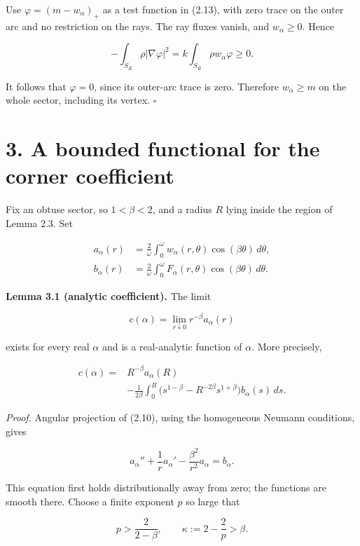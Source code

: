 \documentclass[11pt]{article}
\begin{document}
Use \(\varphi=(m-w_\alpha)_+\) as a test function in (2.13), with zero
trace on the outer arc and no restriction on the rays. The ray fluxes
vanish, and \(w_\alpha\ge0\). Hence

\[
-\int_{S_R}\rho|\nabla\varphi|^2
=k\int_{S_R}\rho w_\alpha\varphi\ge0.
\tag{2.14}
\]

It follows that \(\varphi=0\), since its outer-arc trace is zero.
Therefore \(w_\alpha\ge m\) on the whole sector, including its vertex. \(\square\)

\section{3. A bounded functional for the corner
coefficient}\label{a-bounded-functional-for-the-corner-coefficient}

Fix an obtuse sector, so \(1<\beta<2\), and a radius \(R\) lying inside
the region of Lemma 2.3. Set

\[
\begin{aligned}
a_\alpha(r)&=\frac2\omega\int_0^\omega
w_\alpha(r,\theta)\cos(\beta\theta)\,d\theta,\\
b_\alpha(r)&=\frac2\omega\int_0^\omega
F_\alpha(r,\theta)\cos(\beta\theta)\,d\theta.
\end{aligned}
\tag{3.1}
\]

\textbf{Lemma 3.1 (analytic coefficient).} The limit

\[
c(\alpha)=\lim_{r\downarrow0}r^{-\beta}a_\alpha(r)
\tag{3.2}
\]

exists for every real \(\alpha\) and is a real-analytic function of
\(\alpha\). More precisely,

\[
\begin{aligned}
c(\alpha)={}&R^{-\beta}a_\alpha(R)\\
&-\frac1{2\beta}\int_0^R
\big(s^{1-\beta}-R^{-2\beta}s^{1+\beta}\big)b_\alpha(s)\,ds.
\end{aligned}
\tag{3.3}
\]

\emph{Proof.} Angular projection of (2.10), using the homogeneous
Neumann conditions, gives

\[
a_\alpha''+\frac1r a_\alpha'-\frac{\beta^2}{r^2}a_\alpha=b_\alpha.
\tag{3.4}
\]

This equation first holds distributionally away from zero; the functions
are smooth there. Choose a finite exponent \(p\) so large that

\[
p>\frac2{2-\beta},\qquad \kappa:=2-\frac2p>\beta.
\tag{3.5}
\]
\end{document}
